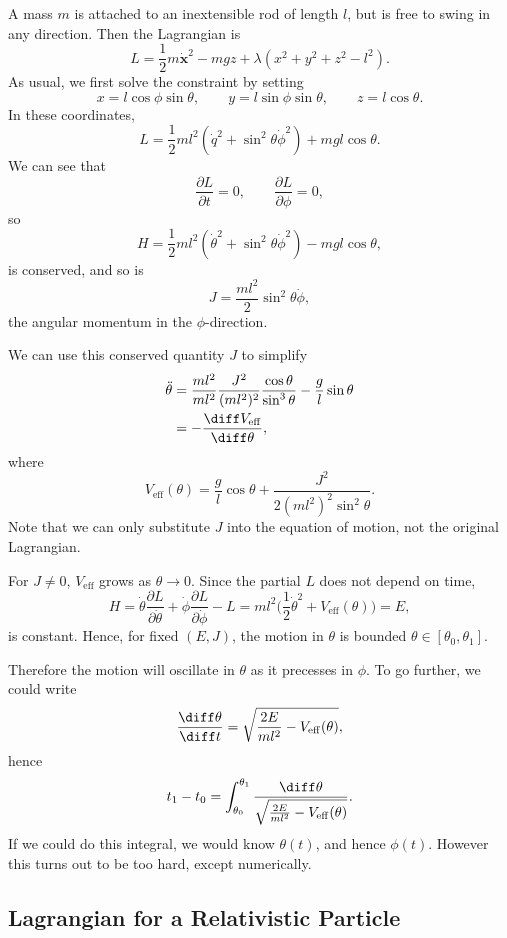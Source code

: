 \documentclass[12pt]{article}
\begin{document}
\begin{exbox}
	A mass $m$ is attached to an inextensible rod of length $l$, but is free to swing in any direction. Then the Lagrangian is
	\[
	L = \frac{1}{2} m \mathbf{\dot x}^2 - mgz + \lambda (x^2 + y^2 + z^2 - l^2).
	\]
	As usual, we first solve the constraint by setting
	\[
	x = l \cos \phi \sin\theta, \qquad y = l \sin \phi \sin \theta, \qquad z = l \cos \theta.
	\]
	In these coordinates,
	\[
	L = \frac{1}{2} m l^2 (\dot q^2 + \sin^2 \theta \dot \phi^2) + mgl \cos \theta.
	\]
	We can see that
	\[
	\frac{\partial L}{\partial t} = 0, \qquad \frac{\partial L}{\partial \phi} = 0,
	\]
	so
	\[
	H = \frac{1}{2} m l^2 (\dot \theta^2 + \sin^2 \theta \dot \phi^2) - mg l \cos \theta,
	\]
	is conserved, and so is
	\[
	J = \frac{ml^2}{2} \sin^2 \theta \dot \phi,
	\]
	the angular momentum in the $\phi$-direction.

	We can use this conserved quantity $J$ to simplify
	\begin{align*}
		\ddot \theta &= \frac{ml^2}{ml^2} \frac{J^2}{(ml^2)^2} \frac{\cos \theta}{\sin^3\theta} - \frac{g}{l} \sin \theta \\
			     &= - \frac{\diff V_{\mathrm{eff}}}{\diff \theta},
	\end{align*}
	where
	\[
	V_{\mathrm{eff}}(\theta) = \frac{g}{l}\cos \theta + \frac{J^2}{2(ml^2)^2\sin^2 \theta}.
	\]
	Note that we can only substitute $J$ into the equation of motion, not the original Lagrangian.

	For $J \neq 0$, $V_{\mathrm{eff}}$ grows as $\theta \to 0$. Since the partial $L$ does not depend on time,
	\[
	H = \dot \theta \frac{\partial L}{\partial \dot \theta} + \dot \phi \frac{\partial L}{\partial \dot \phi} - L = ml^2 \biggl(\frac{1}{2} \dot \theta^2 + V_{\mathrm{eff}}(\theta) \biggr) = E,
	\]
	is constant. Hence, for fixed $(E, J)$, the motion in $\theta$ is bounded $\theta \in [\theta_0, \theta_1]$.

	Therefore the motion will oscillate in $\theta$ as it precesses in $\phi$. To go further, we could write
	\[
		\frac{\diff \theta}{\diff t} = \sqrt{\frac{2E}{ml^2} - V_{\mathrm{eff}}(\theta)},
	\]
	hence
	\[
		t_1 - t_0 = \int_{\theta_0}^{\theta_1} \frac{\diff \theta}{\sqrt{\frac{2E}{ml^2} - V_{\mathrm{eff}}(\theta)}}.
	\]
	If we could do this integral, we would know $\theta(t)$, and hence $\phi(t)$. However this turns out to be too hard, except numerically.
\end{exbox}

\subsection{Lagrangian for a Relativistic Particle}
\label{sub:l_relativistic}
\end{document}
